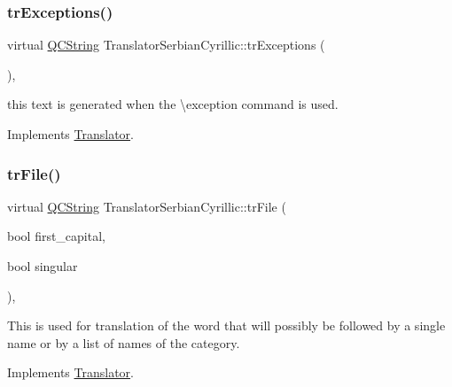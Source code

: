 \mbox{\label{class_translator_serbian_cyrillic_aa2bfbaae043f9a0f8473ffba434812b6}} 
\subsubsection{\texorpdfstring{trExceptions()}{trExceptions()}}
{\footnotesize\ttfamily virtual \mbox{\hyperlink{class_q_c_string}{Q\+C\+String}} Translator\+Serbian\+Cyrillic\+::tr\+Exceptions (\begin{DoxyParamCaption}{ }\end{DoxyParamCaption})\hspace{0.3cm}{\ttfamily [inline]}, {\ttfamily [virtual]}}

this text is generated when the \textbackslash{}exception command is used. 

Implements \mbox{\hyperlink{class_translator}{Translator}}.

\mbox{\label{class_translator_serbian_cyrillic_abe6a18cb43ae01fc5613ac70e79057f2}} 
\subsubsection{\texorpdfstring{trFile()}{trFile()}}
{\footnotesize\ttfamily virtual \mbox{\hyperlink{class_q_c_string}{Q\+C\+String}} Translator\+Serbian\+Cyrillic\+::tr\+File (\begin{DoxyParamCaption}\item[{bool}]{first\+\_\+capital,  }\item[{bool}]{singular }\end{DoxyParamCaption})\hspace{0.3cm}{\ttfamily [inline]}, {\ttfamily [virtual]}}

This is used for translation of the word that will possibly be followed by a single name or by a list of names of the category. 

Implements \mbox{\hyperlink{class_translator}{Translator}}.

\mbox{\label{class_translator_serbian_cyrillic_a8d2d65276cbb4cc04c5d72fe74da4266}} 
